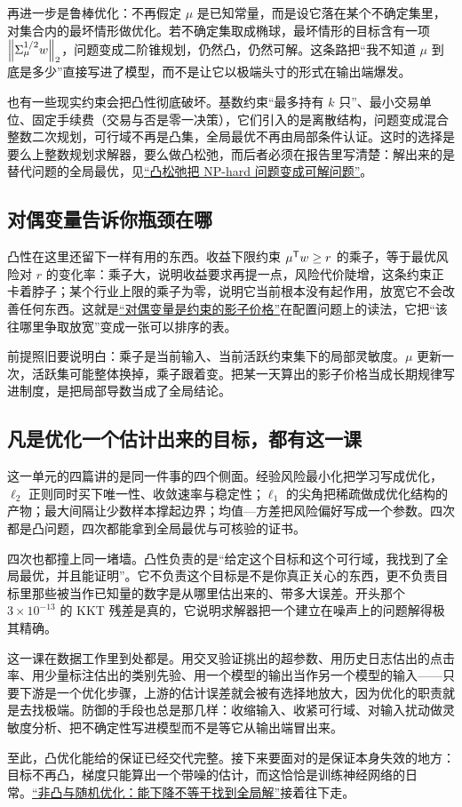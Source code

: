 再进一步是鲁棒优化：不再假定 \(\mu\) 是已知常量，而是设它落在某个不确定集里，对集合内的最坏情形做优化。若不确定集取成椭球，最坏情形的目标含有一项 \(\left\lVert\Sigma_\mu^{1/2}w\right\rVert_2\)，问题变成二阶锥规划，仍然凸，仍然可解。这条路把``我不知道 \(\mu\) 到底是多少''直接写进了模型，而不是让它以极端头寸的形式在输出端爆发。

也有一些现实约束会把凸性彻底破坏。基数约束``最多持有 \(k\) 只''、最小交易单位、固定手续费（交易与否是零一决策），它们引入的是离散结构，问题变成混合整数二次规划，可行域不再是凸集，全局最优不再由局部条件认证。这时的选择是要么上整数规划求解器，要么做凸松弛，而后者必须在报告里写清楚：解出来的是替代问题的全局最优，见\hyperref[sec:09-Convex-Optimization/09-Complexity-and-Approximation/02]{``凸松弛把 NP-hard 问题变成可解问题''}。

\subsection{对偶变量告诉你瓶颈在哪}

凸性在这里还留下一样有用的东西。收益下限约束 \(\mu^{\mathsf{T}}w\ge r\) 的乘子，等于最优风险对 \(r\) 的变化率：乘子大，说明收益要求再提一点，风险代价陡增，这条约束正卡着脖子；某个行业上限的乘子为零，说明它当前根本没有起作用，放宽它不会改善任何东西。这就是\hyperref[sec:09-Convex-Optimization/05-Duality/04]{``对偶变量是约束的影子价格''}在配置问题上的读法，它把``该往哪里争取放宽''变成一张可以排序的表。

前提照旧要说明白：乘子是当前输入、当前活跃约束集下的局部灵敏度。\(\mu\) 更新一次，活跃集可能整体换掉，乘子跟着变。把某一天算出的影子价格当成长期规律写进制度，是把局部导数当成了全局结论。

\subsection{凡是优化一个估计出来的目标，都有这一课}

这一单元的四篇讲的是同一件事的四个侧面。经验风险最小化把学习写成优化，\(\ell_2\) 正则同时买下唯一性、收敛速率与稳定性；\(\ell_1\) 的尖角把稀疏做成优化结构的产物；最大间隔让少数样本撑起边界；均值---方差把风险偏好写成一个参数。四次都是凸问题，四次都能拿到全局最优与可核验的证书。

四次也都撞上同一堵墙。凸性负责的是``给定这个目标和这个可行域，我找到了全局最优，并且能证明''。它不负责这个目标是不是你真正关心的东西，更不负责目标里那些被当作已知量的数字是从哪里估出来的、带多大误差。开头那个 \(3\times10^{-13}\) 的 KKT 残差是真的，它说明求解器把一个建立在噪声上的问题解得极其精确。

这一课在数据工作里到处都是。用交叉验证挑出的超参数、用历史日志估出的点击率、用少量标注估出的类别先验、用一个模型的输出当作另一个模型的输入——只要下游是一个优化步骤，上游的估计误差就会被有选择地放大，因为优化的职责就是去找极端。防御的手段也总是那几样：收缩输入、收紧可行域、对输入扰动做灵敏度分析、把不确定性写进模型而不是等它从输出端冒出来。

至此，凸优化能给的保证已经交代完整。接下来要面对的是保证本身失效的地方：目标不再凸，梯度只能算出一个带噪的估计，而这恰恰是训练神经网络的日常。\hyperref[ch:078]{``非凸与随机优化：能下降不等于找到全局解''}接着往下走。
